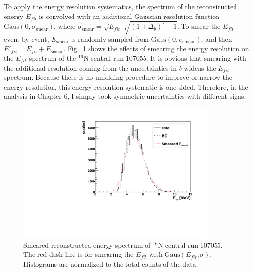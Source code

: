 To apply the energy resolution systematics, the spectrum of the reconstructed energy $E_{fit}$ is convolved with an additional Gaussian resolution function $\mathrm{Gaus}(0,\sigma_\mathrm{smear})$, where $\sigma_\mathrm{smear}=\sqrt{E_{fit}} \; \sqrt{(1+\Delta_{b})^2-1}$. To smear the $E_{fit}$ event by event, $E_\mathrm{smear}$ is randomly sampled from $\mathrm{Gaus}(0,\sigma_\mathrm{smear})$, and then $E'_{fit}=E_{fit}+E_\mathrm{smear}$. Fig.~\ref{fig:EresolSmear} shows the effects of smearing the energy resolution on the $E_{fit}$ spectrum of the $^{16}$N central run 107055. It is obvious that smearing with the additional resolution coming from the uncertainties in $b$ widens the $E_{fit}$ spectrum. Because there is no unfolding procedure to improve or narrow the energy resolution, this energy resolution systematic is one-sided\cite{marzec2019measurement}. Therefore, in the analysis in Chapter 6, I simply took symmetric uncertainties with different signs.
\begin{figure}
	\centering
	\includegraphics[width=10cm]{SmearedEresol_N16_new.pdf}
	\caption[Smeared reconstructed energy spectrum of $^{16}$N central run 107055.]{Smeared reconstructed energy spectrum of $^{16}$N central run 107055. The red dash line is for smearing the $E_{fit}$ with $\mathrm{Gaus}(E_{fit},\sigma)$. Histograms are normalized to the total counts of the data.\label{fig:EresolSmear}}
\end{figure}
